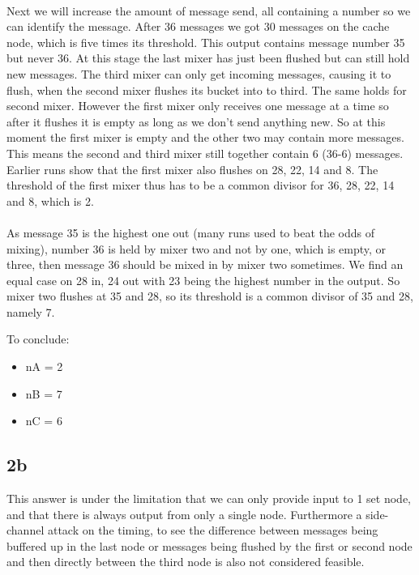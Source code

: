 \documentclass{article}
\begin{document}
\paragraph{} Next we will increase the amount of message send, all containing a number so we can identify the message.
After 36 messages we got 30 messages on the cache node, which is five times its threshold.
This output contains message number 35 but never 36.
At this stage the last mixer has just been flushed but can still hold new messages. The third mixer can only get incoming messages, causing it to flush, when the second mixer flushes its bucket into to third.
The same holds for second mixer. However the first mixer only receives one message at a time so after it flushes it is empty as long as we don't send anything new. So at this moment the first mixer is empty and the other two may contain more messages.
This means the second and third mixer still together contain 6 (36-6) messages. 
Earlier runs show that the first mixer also flushes on 28, 22, 14 and 8. The threshold of the first mixer thus has to be a common divisor for 36, 28, 22, 14 and 8, which is 2.
\paragraph{}
As message 35 is the highest one out (many runs used to beat the odds of mixing), number 36 is held by mixer two and not by one, which is empty, or three, then message 36 should be mixed in by mixer two sometimes.
We find an equal case on 28 in, 24 out with 23 being the highest number in the output. 
So mixer two flushes at 35 and 28, so its threshold is a common divisor of 35 and 28, namely 7.

To conclude:
\begin{itemize}
 \item nA = 2
 \item nB = 7
 \item nC = 6
\end{itemize}

\subsection*{2b}
This answer is under the limitation that we can only provide input to 1 set node, and that there is always output from only a single node. Furthermore a side-channel attack on the timing, to see the difference between messages being buffered up in the last node or messages being flushed by the first or second node and then directly between the third node is also not considered feasible.
\end{document}
